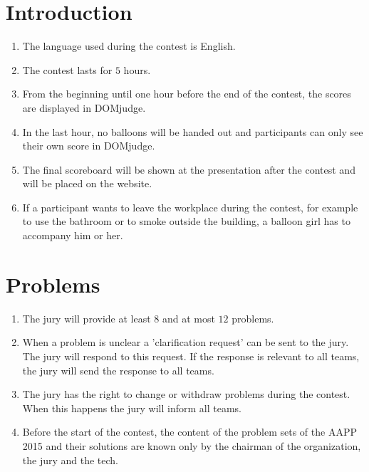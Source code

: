 \documentclass[11pt]{report}
\begin{document}
\section{Introduction}
\begin{enumerate}[label=\bfseries 4.1.\arabic*]
\item The language used during the contest is English.
\item The contest lasts for $5$ hours.
\item From the beginning until one hour before the end of the contest, the scores are displayed in DOMjudge.
\item In the last hour, no balloons will be handed out and participants can only see their own score in DOMjudge.
\item The final scoreboard will be shown at the presentation after the contest and will be placed on the website.
\item \label{leaveTheWorkplace} If a participant wants to leave the workplace during the contest, for example to use the bathroom or to smoke outside the building, a balloon girl has to accompany him or her.
\end{enumerate}

\section{Problems}
\begin{enumerate}[label=\bfseries 4.2.\arabic*]
\item The jury will provide at least $8$ and at most $12$ problems.
\item When a problem is unclear a 'clarification request' can be sent to the jury. The jury will respond to this request. If the response is relevant to all teams, the jury will send the response to all teams.
\item The jury has the right to change or withdraw problems during the contest. When this happens the jury will inform all teams.
\item \label{content} Before the start of the contest, the content of the problem sets of the AAPP 2015 and their solutions are known only by the chairman of the organization, the jury and the tech.
\end{enumerate}
\end{document}
